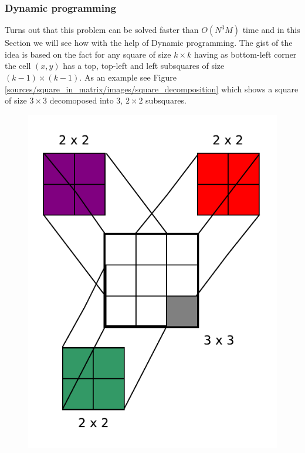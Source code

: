 \subsubsection{Dynamic programming}
Turns out that this problem can be solved faster than $O(N^3M)$ time and in this Section we will see
how with the help of Dynamic programming. The gist of the idea is based on the fact for any square
of size $k\times k$ having as bottom-left corner the cell $(x,y)$  has a top, top-left and left
subsquares of size $(k-1)\times (k-1)$. As an example see Figure
\ref{sources/square_in_matrix/images/square_decomposition} which shows a square of size $3\times 3$
decomoposed into $3$, $2\times 2$ subsquares.
\begin{figure}
	\centering
	\label{fig:square_in_matrix:squa_matrix_incremental}
	\includegraphics[width=\textwidth/2]{sources/square_in_matrix/images/square_decomposition}
	\caption[]{}
\end{figure}

